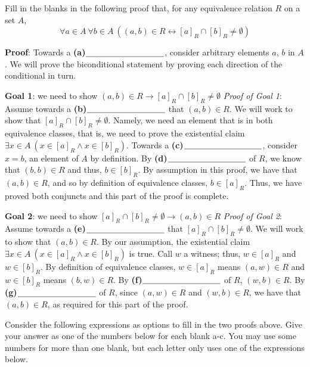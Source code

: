 
Fill in the blanks in the following proof that, for any equivalence relation $R$ on a set $A$,
\[
\forall a \in A ~\forall b \in A~\left( (a,b) \in R \leftrightarrow [a]_R\cap [b]_R \neq \emptyset \right)
\]

{\bf Proof}: Towards a  \textbf{(a)}$\underline{\phantom{\hspace{1.3in}}}$, consider arbitrary elements $a$, $b$ in $A$. We will 
prove the biconditional statement by proving each direction of the conditional in turn.

{\bf Goal 1}: we need to show $(a,b) \in R \to [a]_R\cap [b]_R \neq \emptyset$
{\it Proof of Goal 1}: Assume towards a \textbf{(b)}$\underline{\phantom{\hspace{1.3in}}}$ 
that $(a,b) \in R$. We will work to show
that $[a]_R\cap [b]_R \neq \emptyset$. Namely, we need an element that is in both equivalence classes, that is, we
 need to prove the existential claim $\exists x \in A ~(x \in [a]_{R} \land x \in [b]_{R})$. 
 Towards a \textbf{(c)}$\underline{\phantom{\hspace{1.3in}}}$, consider $x = b$, 
 an element of $A$ by definition. By \textbf{(d)}$\underline{\phantom{\hspace{1.3in}}}$  of $R$, we know that $(b,b) \in R$ 
 and thus, $b \in [b]_{R}$.
 By assumption in this proof, we have that $(a,b) \in R$, and so by  definition of equivalence classes, $b \in [a]_R$.
 Thus, we have proved both conjuncts and this part of the proof is complete.
 
{\bf Goal 2}: we need to show $[a]_R\cap [b]_R \neq \emptyset \to (a,b) \in R $
{\it Proof of Goal 2}: Assume towards a \textbf{(e)}$\underline{\phantom{\hspace{1.3in}}}$ 
that $[a]_R\cap [b]_R \neq \emptyset $. We will work to show
that $(a,b) \in R$. By our assumption, the existential claim $\exists x \in A ~(x \in [a]_{R} \land x \in [b]_{R})$
is true. Call $w$ a witness; thus, $w \in [a]_R$ and $w \in [b]_R$. 
By  definition of equivalence classes, $w \in [a]_R$ means $(a,w) \in R$ and $w \in [b]_R$ means $(b,w) \in R$.
By \textbf{(f)}$\underline{\phantom{\hspace{1.3in}}}$  of $R$, $(w,b) \in R$. By 
\textbf{(g)}$\underline{\phantom{\hspace{1.3in}}}$ of $R$, since $(a,w) \in R$ and $(w,b) \in R$, we have that
$(a,b) \in R$, as required for  this part of the proof.
 
Consider the following expressions as options to fill in the two proofs above. Give your answer as one of the numbers below for each blank a-c. You may use some numbers for more than one blank, but each letter only uses one of the expressions below.

